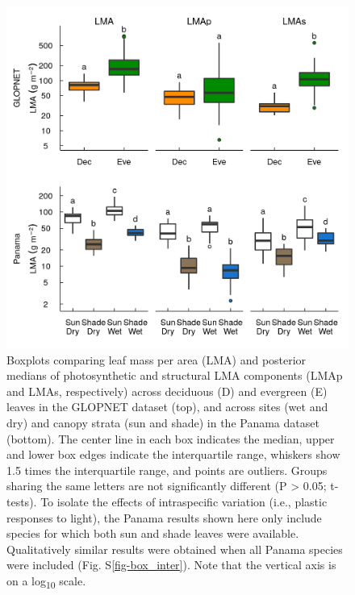\documentclass[
  12pt,
  a4paper,
,tablecaptionabove
]{scrartcl}
\begin{document}
\newpage

\begin{figure}

{\centering \includegraphics{../figs/box_main.png}

}

\caption{\label{fig-boxplt}Boxplots comparing leaf mass per area (LMA)
and posterior medians of photosynthetic and structural LMA components
(LMAp and LMAs, respectively) across deciduous (D) and evergreen (E)
leaves in the GLOPNET dataset (top), and across sites (wet and dry) and
canopy strata (sun and shade) in the Panama dataset (bottom). The center
line in each box indicates the median, upper and lower box edges
indicate the interquartile range, whiskers show 1.5 times the
interquartile range, and points are outliers. Groups sharing the same
letters are not significantly different (P \textgreater{} 0.05;
t-tests). To isolate the effects of intraspecific variation (i.e.,
plastic responses to light), the Panama results shown here only include
species for which both sun and shade leaves were available.
Qualitatively similar results were obtained when all Panama species were
included (Fig. S\ref{fig-box_inter}). Note that the vertical axis is on
a log\textsubscript{10} scale.}

\end{figure}
\end{document}
